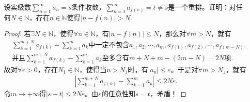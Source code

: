 \documentclass[../../main.tex]{subfiles}%
\begin{document}
\begin{example}
设实级数$\sum_{n=1}^{\infty} a_n = s$条件收敛，$\sum_{n=1}^{\infty} a_{f(n)} = t \neq s$是一个重排。证明：对任何$N \in \mathbb{N}$，存在$n \in \mathbb{N}$使得$|n - f(n)| > N$.
\end{example}
\begin{proof}

若$\exists N\in \mathbb{N}$，使得$\forall n\in \mathbb{N}$，有$\left| n-f\left( n \right) \right|\leqslant N$，那么对$\forall m>N$，就有
\begin{align*}
&\sum_{k=1}^{m+N}{a_{f\left( k \right)}}-\sum_{k=1}^m{a_k}\text{中一定不包含}a_1,a_2,\cdots ,a_m,a_{f\left( 1 \right)},a_{f\left( 2 \right)},\cdots ,a_{f\left( m-N \right)}.
\\
&\text{并且}\sum_{k=1}^{m+N}{a_{f\left( k \right)}}-\sum_{k=1}^m{a_k}\text{至多含有}m+N+m-\left( 2m-N \right) =2N\text{项}.
\end{align*}
故对$\forall \varepsilon >0$，存在$N_1\in \mathbb{N}$，使得当$n>N_1$时，有$\left| a_n \right|\leqslant \varepsilon$。于是对$\forall m>N_1$，就有
\begin{align*}
\left| \sum_{k=1}^{m+N}{a_{f\left( k \right)}}-\sum_{k=1}^m{a_k} \right|\leqslant 2N\varepsilon.
\end{align*}
令$m\rightarrow +\infty$得$\left| s-t \right|\leqslant 2N\varepsilon$。由$\varepsilon$的任意性知$s=t$，矛盾！

\end{proof}
\end{document}
